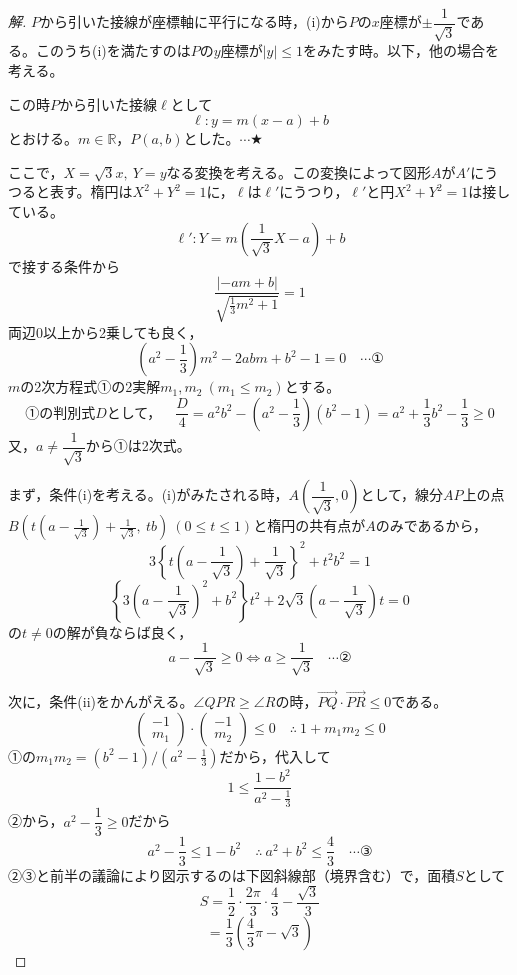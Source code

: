 \documentclass[../main.tex]{subfiles}
\begin{document}
\begin{proof}[解]
  $P$から引いた接線が座標軸に平行になる時，(i)から$P$の$x$座標が$\pm\dfrac{1}{\sqrt3}$である。このうち(i)を満たすのは$P$の$y$座標が$|y|\le1$をみたす時。以下，他の場合を考える。

  この時$P$から引いた接線$\ell$として
  \[
    \ell: y=m(x-a)+b
  \]
  とおける。$m\in\mathbb{R}$，$P(a,b)$とした。$\cdots\bigstar$

  ここで，$X=\sqrt3x,\ Y=y$なる変換を考える。この変換によって図形$A$が$A'$にうつると表す。楕円は$X^2+Y^2=1$に，$\ell$は$\ell'$にうつり，$\ell'$と円$X^2+Y^2=1$は接している。
  \[
    \ell': Y=m\left(\frac{1}{\sqrt3}X-a\right)+b
  \]
  で接する条件から
  \[
    \frac{|-am+b|}{\sqrt{\frac13m^2+1}}=1
  \]
  両辺0以上から2乗しても良く，
  \[
    \left(a^2-\frac13\right)m^2-2abm+b^2-1=0 \quad\cdots\text{①}
  \]
  $m$の2次方程式①の2実解$m_1,m_2\ (m_1\le m_2)$とする。
  \[
    \text{①の判別式}D\text{として，}\quad\frac{D}{4}=a^2b^2-\left(a^2-\frac13\right)(b^2-1)=a^2+\frac13b^2-\frac13\ge0
  \]
  又，$a\ne\dfrac{1}{\sqrt3}$から①は2次式。

  まず，条件(i)を考える。(i)がみたされる時，$A\left(\dfrac{1}{\sqrt3},0\right)$として，線分$AP$上の点$B(t(a-\tfrac{1}{\sqrt3})+\tfrac{1}{\sqrt3},\ tb)\ (0\le t\le1)$と楕円の共有点が$A$のみであるから，
  \[
    3\left\{t\left(a-\frac{1}{\sqrt3}\right)+\frac{1}{\sqrt3}\right\}^2+t^2b^2=1
  \]
  \[
    \left\{3\left(a-\frac{1}{\sqrt3}\right)^2+b^2\right\}t^2+2\sqrt3\left(a-\frac{1}{\sqrt3}\right)t=0
  \]
  の$t\ne0$の解が負ならば良く，
  \[
    a-\frac{1}{\sqrt3}\ge0 \iff a\ge\frac{1}{\sqrt3} \quad\cdots\text{②}
  \]

  次に，条件(ii)をかんがえる。$\angle QPR\ge\angle R$の時，$\overrightarrow{PQ}\cdot\overrightarrow{PR}\le0$である。
  \[
    \begin{pmatrix}-1\\m_1
    \end{pmatrix}\cdot
    \begin{pmatrix}-1\\m_2
    \end{pmatrix}\le0 \quad\therefore\ 1+m_1m_2\le0
  \]
  ①の$m_1m_2=(b^2-1)/(a^2-\tfrac13)$だから，代入して
  \[
    1\le\frac{1-b^2}{a^2-\frac13}
  \]
  ②から，$a^2-\dfrac13\ge0$だから
  \[
    a^2-\frac13\le1-b^2 \quad\therefore\ a^2+b^2\le\frac43 \quad\cdots\text{③}
  \]
  ②③と前半の議論により図示するのは下図斜線部（境界含む）で，面積$S$として
  \[
    S=\frac12\cdot\frac{2\pi}{3}\cdot\frac43-\frac{\sqrt3}{3}
  \]
  \[
    =\frac13\left(\frac{4}{3}\pi-\sqrt3\right)
  \]


\end{proof}
\end{document}

